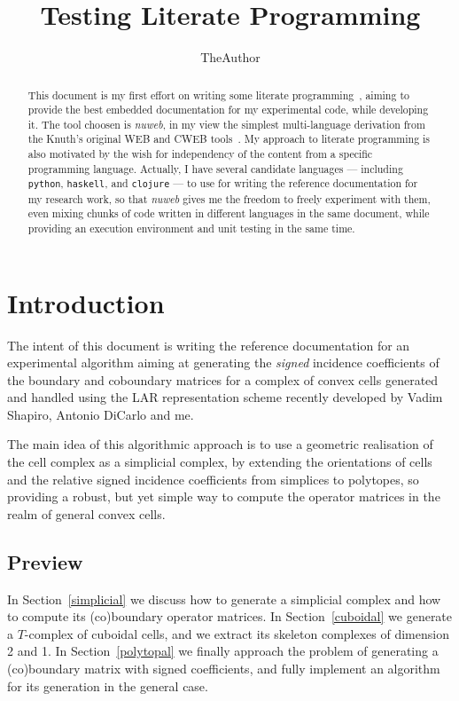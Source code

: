 \documentclass[11pt,oneside]{article}	%
\title{Testing Literate Programming}
\author{TheAuthor}
\begin{document}
\maketitle
\nonstopmode


\begin{abstract}
This document is my first effort on writing some literate programming~\cite{Knuth:1984:LP:473.479,Knuth:1992:LP:129057}, aiming to provide the best embedded documentation for my experimental code, while developing it. The tool choosen is \emph{nuweb}, in my view the simplest multi-language derivation from the Knuth's original WEB and CWEB tools~\cite{Knuth:1994:CSS:561208}. My approach to literate programming is also motivated by the wish for independency of the content from a specific programming language. Actually, I have several candidate languages --- including \texttt{python}, \texttt{haskell}, and \texttt{clojure} --- to use for writing the reference documentation for my research work, so that \emph{nuweb} gives me the freedom to freely experiment with them, even mixing chunks of code written in different languages in the same document, while providing an execution environment and unit testing in the same time. 
\end{abstract}

\tableofcontents
\newpage

\section{Introduction}

The  intent of this document is writing the reference documentation for an experimental algorithm aiming at generating the \emph{signed} incidence coefficients of the boundary and coboundary matrices for a complex of convex cells generated and handled using the LAR representation scheme recently developed by Vadim Shapiro, Antonio DiCarlo and me.

The main idea of this algorithmic approach is to use a geometric realisation of the cell complex as a simplicial complex, by extending the orientations of cells and the relative signed incidence coefficients from simplices to polytopes, so providing a robust, but yet simple way to compute the operator matrices in the realm of general convex cells.

\subsection{Preview}
In Section~\ref{simplicial} we discuss how to generate a simplicial complex and how to compute its (co)boundary operator matrices. In Section~\ref{cuboidal} we generate a $T$-complex of cuboidal cells, and we extract its skeleton complexes of dimension 2 and 1. In Section~\ref{polytopal} we finally approach the problem of generating a (co)boundary matrix with signed coefficients, and fully implement an algorithm for its generation in the general case.
\end{document}
